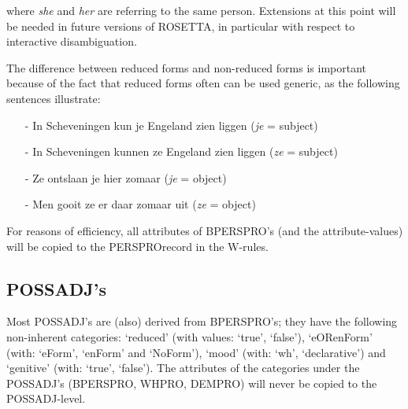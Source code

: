 where {\em she} and {\em her} are referring to the same person. Extensions at 
this point will be needed in future versions of ROSETTA, in particular with 
respect 
to interactive disambiguation.

The difference between reduced forms and non-reduced forms is important
because of the fact that reduced forms often can be used generic, as the 
following sentences illustrate:
\begin{itemize}
  \item [-] In Scheveningen kun je Engeland zien liggen     
            ({\em je}  = subject)
  \item [-] In Scheveningen kunnen ze Engeland zien liggen  
            ({\em ze}  = subject)
  \item [-] Ze ontslaan je hier zomaar                      ({\em je}  = object)
  \item [-] Men gooit ze er daar zomaar uit                 ({\em ze}  = object)
\end{itemize}

For reasons of efficiency, all attributes of BPERSPRO's 
(and the attribute-values) will be copied to the PERSPROrecord in the 
W-rules.

\subsection{POSSADJ's}

Most POSSADJ's are (also) derived from BPERSPRO's; they have the following 
non-inherent categories: `reduced' (with values: `true', `false'), 
`eORenForm' (with: `eForm', `enForm' and `NoForm'), `mood' (with: `wh', 
`declarative') and `genitive' (with: `true', `false'). The attributes of the 
categories under the POSSADJ's (BPERSPRO, WHPRO, DEMPRO) will never be 
copied to the POSSADJ-level.

